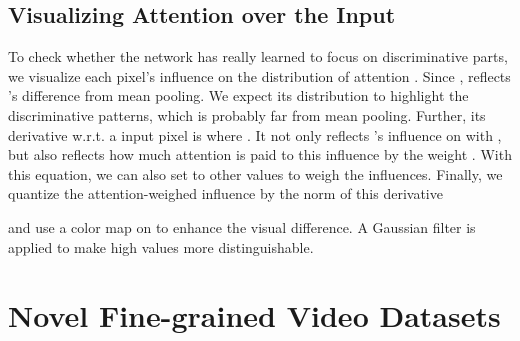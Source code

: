 \documentclass[runningheads]{llncs}
\begin{document}
\subsection{Visualizing Attention over the Input}\label{sec:visualize}
To check whether the network has really learned to focus on discriminative parts, we visualize each pixel's influence on the distribution of attention . Since ,  reflects 's difference from mean pooling. We expect its distribution to highlight the discriminative patterns, which is probably far from mean pooling. Further, its derivative w.r.t. a input pixel  is 
where . It not only reflects 's influence on  with , but also reflects how much attention is paid to this influence by the weight . With this equation, we can also set  to other values to weigh the influences. Finally, we quantize the attention-weighed influence by the  norm of this derivative

and use a color map on  to enhance the visual difference. A Gaussian filter is applied to make high values more distinguishable.

 \section{Novel Fine-grained Video Datasets}
\end{document}
